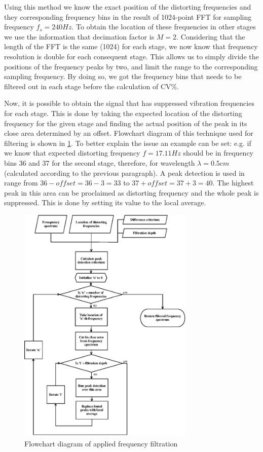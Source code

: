 \documentclass[twoside]{ctuthesis}
\theoremstyle{plain}
\theoremstyle{definition}
\theoremstyle{note}
\begin{document}
Using this method we know the exact position of the distorting frequencies and they corresponding frequency bins in the result of 1024-point FFT for sampling frequency $f_s=240Hz$. To obtain the location of these frequencies in other stages we use the information that decimation factor is $M=2$. Considering that the length of the FFT is the same (1024) for each stage, we now know that frequency resolution is double for each consequent stage. This allows us to simply divide the positions of the frequency peaks by two, and limit the range to the corresponding sampling frequency. By doing so, we got the frequency bins that needs to be filtered out in each stage before the calculation of CV\%.

Now, it is possible to obtain the signal that has suppressed vibration frequencies for each stage. This is done by taking the expected location of the distorting frequency for the given stage and finding the actual position of the peak in its close area determined by an offset. Flowchart diagram of this technique used for filtering is shown in \ref{fig:frequencyFiltration}. To better explain the issue an example can be set: e.g. if we know that expected distorting frequency $f=17.11Hz$ should be in frequency bins 36 and 37 for the second stage, therefore, for wavelength $\lambda=0.5cm$ (calculated according to the previous paragraph). A peak detection is used in range from $36-offset=36-3=33$ to $37+offset=37+3=40$. The highest peak in this area can be proclaimed as distorting frequency and the whole peak is suppressed. This is done by setting its value to the local average.

\begin{figure}[h]
	\centering
	\includegraphics[width=0.75\textwidth]{frequencyFiltration.eps}
	\caption{Flowchart diagram of applied frequency filtration}
	\label{fig:frequencyFiltration}
\end{figure}
\end{document}
